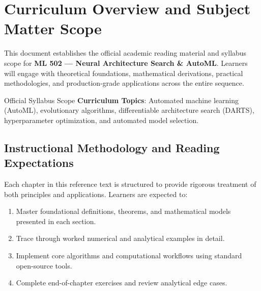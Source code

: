 \section{Curriculum Overview and Subject Matter Scope}

This document establishes the official academic reading material and syllabus scope for \textbf{ML 502 --- Neural Architecture Search \& AutoML}. Learners will engage with theoretical foundations, mathematical derivations, practical methodologies, and production-grade applications across the entire sequence.

\begin{InsightBox}{Official Syllabus Scope}
  \textbf{Curriculum Topics}: Automated machine learning (AutoML), evolutionary algorithms, differentiable architecture search (DARTS), hyperparameter optimization, and automated model selection.
\end{InsightBox}

\subsection{Instructional Methodology and Reading Expectations}

Each chapter in this reference text is structured to provide rigorous treatment of both principles and applications. Learners are expected to:
\begin{enumerate}
  \item Master foundational definitions, theorems, and mathematical models presented in each section.
  \item Trace through worked numerical and analytical examples in detail.
  \item Implement core algorithms and computational workflows using standard open-source tools.
  \item Complete end-of-chapter exercises and review analytical edge cases.
\end{enumerate}

